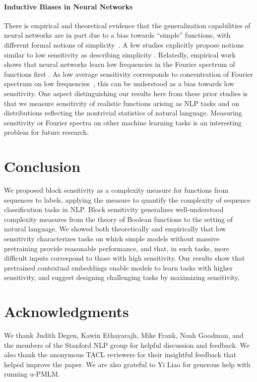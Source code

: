 \documentclass[11pt,a4paper]{article}
\begin{document}
\paragraph{Inductive Biases in Neural Networks}
There is empirical and theoretical evidence that the generalization capabilities of neural networks are in part due to a bias towards ``simple'' functions, with different formal notions of simplicity~\citep[e.g.][]{franco2006generalization,de2018deep,valle-perez2019deep}.
A few studies explicitly propose notions similar to low sensitivity as describing simplicity \citep{franco2006generalization,de2018deep,novak2018sensitivity}.
Relatedly, empirical work shows that neural networks learn low frequencies in the Fourier spectrum of functions first \citep{rahaman2019on,xu2019training,cao2019towards}.
As low average sensitivity corresponds to concentration of Fourier spectrum on low frequencies~\citep[Prop. 3.2]{odonnell2014analysis}, this can be understood as a bias towards low sensitivity.
One aspect distinguishing our results here from these prior studies is that we measure sensitivity of realistic functions arising as NLP tasks and on distributions reflecting the nontrivial statistics of natural language. Measuring sensitivity or Fourier spectra on other machine learning tasks is an interesting problem for future research.


\section{Conclusion}
\label{sec:conclusion}
We proposed block sensitivity as a complexity measure for functions from sequences to labels, applying the measure to quantify the complexity of sequence classification tasks in NLP.
Block sensitivity generalizes well-understood complexity measures from the theory of Boolean functions to the setting of natural language.
We showed both theoretically and empirically that low sensitivity characterizes tasks on which simple models without massive pretraining provide reasonable performance, and that, in such tasks, more difficult inputs correspond to those with high sensitivity.
Our results show that pretrained contextual embeddings enable models to learn tasks with higher sensitivity, and suggest designing challenging tasks by maximizing sensitivity,



\section*{Acknowledgments}
We thank Judith Degen, Kawin Ethayarajh, Mike Frank, Noah Goodman, and the members of the Stanford NLP group for helpful discussion and feedback.
We also thank the anonymous TACL reviewers for their insightful feedback that helped improve the paper.
We are also grateful to Yi Liao for generous help with running u-PMLM.



\end{document}
